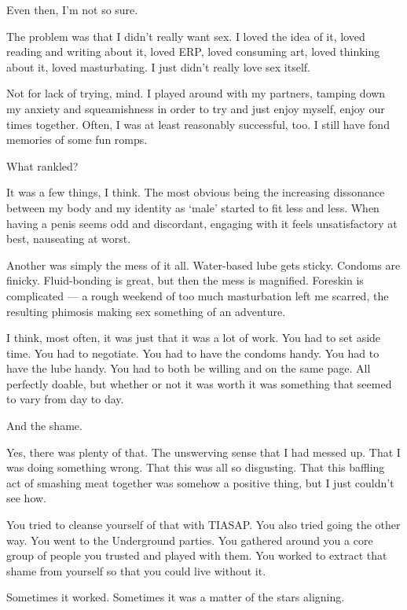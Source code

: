 Even then, I'm not so sure.
\newpage

The problem was that I didn't really want sex. I loved the idea of it, loved reading and writing about it, loved ERP, loved consuming art, loved thinking about it, loved masturbating. I just didn't really love sex itself.

Not for lack of trying, mind. I played around with my partners, tamping down my anxiety and squeamishness in order to try and just enjoy myself, enjoy our times together. Often, I was at least reasonably successful, too. I still have fond memories of some fun romps.

\begin{ally}
What rankled?
\end{ally}
It was a few things, I think. The most obvious being the increasing dissonance between my body and my identity as `male' started to fit less and less. When having a penis seems odd and discordant, engaging with it feels unsatisfactory at best, nauseating at worst.

Another was simply the mess of it all. Water-based lube gets sticky. Condoms are finicky. Fluid-bonding is great, but then the mess is magnified. Foreskin is complicated --- a rough weekend of too much masturbation left me scarred, the resulting phimosis making sex something of an adventure.

I think, most often, it was just that it was a lot of work. You had to set aside time. You had to negotiate. You had to have the condoms handy. You had to have the lube handy. You had to both be willing and on the same page. All perfectly doable, but whether or not it was worth it was something that seemed to vary from day to day.

\begin{ally}
And the shame.
\end{ally}
Yes, there was plenty of that. The unswerving sense that I had messed up. That I was doing something wrong. That this was all so disgusting. That this baffling act of smashing meat together was somehow a positive thing, but I just couldn't see how.

\begin{ally}
You tried to cleanse yourself of that with TIASAP. You also tried going the other way. You went to the Underground parties. You gathered around you a core group of people you trusted and played with them. You worked to extract that shame from yourself so that you could live without it.
\end{ally}
Sometimes it worked. Sometimes it was a matter of the stars aligning.

